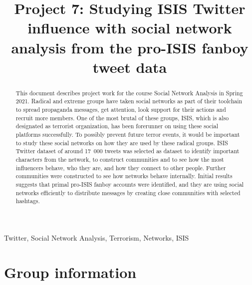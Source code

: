 \documentclass[conference]{IEEEtran}
\begin{document}
    \title{Project 7: Studying ISIS Twitter influence with social network analysis from the pro-ISIS fanboy tweet data}




    \author{
    }

    \maketitle

    \begin{abstract}
        This document describes project work for the course Social Network Analysis in Spring 2021.
        Radical and extreme groups have taken social networks as part of their toolchain to spread propaganda messages,
        get attention, look support for their actions and recruit more members.
        One of the most brutal of these groups, ISIS, which is also designated as terrorist organization, has been forerunner on using these social platforms successfully.
        To possibly prevent future terror events, it would be important to study these social networks on how they are used by these radical groups.
        ISIS Twitter dataset of around 17~000 tweets was selected as dataset to identify important characters from the network, to construct communities and to see how the most influencers behave, who they are, and how they connect to other people.
        Further communities were constructed to see how networks behave internally.
        Initial results suggests that primal pro-ISIS fanboy accounts were identified, and they are using social networks efficiently to distribute messages by creating
        close communities with selected hashtags.

    \end{abstract}

    \begin{IEEEkeywords}
        Twitter, Social Network Analysis, Terrorism, Networks, ISIS
    \end{IEEEkeywords}


    \section{Group information}\label{sec:group-description}
\end{document}
